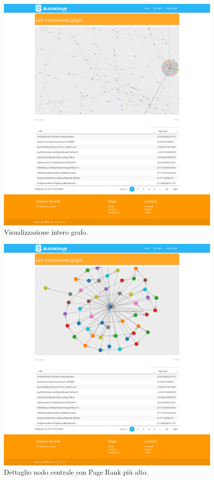 \begin{figure}[H]
	\centering
	\includegraphics[width=\textwidth, height=0.80\textheight]{images/graphView.png}
	\caption{Visualizzazione intero grafo.}
	\label{fig:graphBE}
\end{figure}

\begin{figure}[H]
	\centering
	\includegraphics[width=\textwidth, height=0.80\textheight]{images/lastGraph-1.jpg}
	\caption{Dettaglio nodo centrale con Page Rank più alto.}
	\label{fig:graph1BE}
\end{figure}

